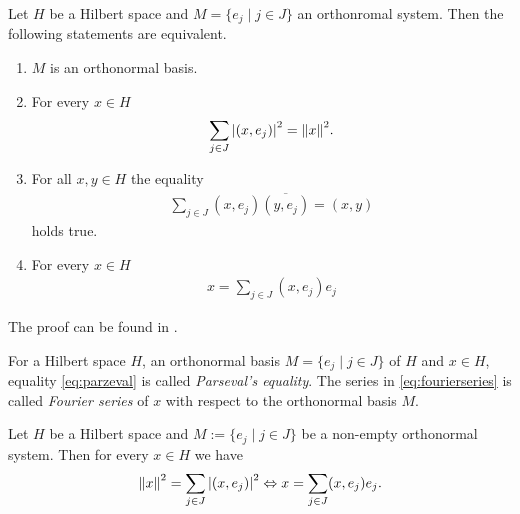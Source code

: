 \begin{theorem}
	Let $H$ be a Hilbert space and $M = \{e_j \mid j \in J\}$ an orthonromal system. Then the following statements are equivalent.
	\begin{enumerate}
		\item $M$ is an orthonormal basis.
		
		\item For every $x \in H$
		\begin{align}\label{eq:parzeval}
		\sum_{j \in J} \vbraces{(x, e_j)}^2 = \norm[]{x}^2.
		\end{align}
		
		\item For all $x,y \in H$ the equality
		\begin{align*}
			\sum_{j \in J} (x, e_j) \overline{(y,e_j)} = (x,y)
		\end{align*}
		holds true.
		
		\item For every $x \in H$  
		\begin{align} \label{eq:fourierseries}
		x = \sum_{j \in J} (x, e_j) e_j
		\end{align}
	\end{enumerate} 
\end{theorem}

The proof can be found in \cite[p. 54]{FAna1}.


\begin{definition}
	For a Hilbert space $H$, an orthonormal basis $M = \{e_j \mid j \in J\}$ of $H$ and $x \in H$, equality \eqref{eq:parzeval} is called \textit{Parseval's equality}. The series in \eqref{eq:fourierseries} is called \textit{Fourier series} of $x$ with respect to the orthonormal basis $M$. 
\end{definition}


\begin{lemma}
	Let $H$ be a Hilbert space and $M := \{e_j \mid j \in J\}$ be a non-empty orthonormal system. Then for every $x \in H$ we have
	\begin{align}
		\norm[]{x}^2 = \sum_{j \in J} \vbraces{(x, e_j)}^2 \Leftrightarrow x = \sum_{j \in J} (x,e_j) e_j. \label{eq:parceval_to_fourier}
	\end{align}
\end{lemma}

